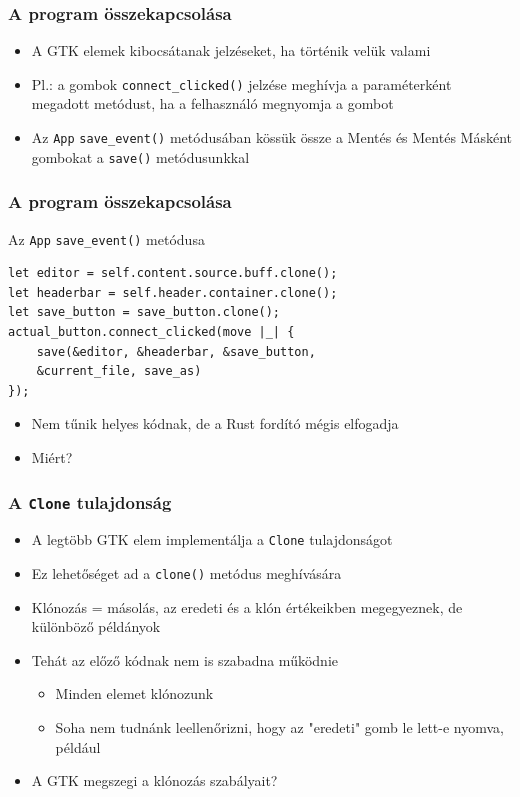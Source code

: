 \documentclass{beamer}
\begin{document}
    \begin{frame}[fragile]
        \frametitle{A program összekapcsolása}

        \begin{itemize}
            \item A GTK elemek kibocsátanak jelzéseket, ha történik velük valami
            \item Pl.: a gombok \texttt{connect\_clicked()} jelzése meghívja a paraméterként megadott metódust, ha a felhasználó megnyomja a gombot
            \item Az \texttt{App} \texttt{save\_event()} metódusában kössük össze a Mentés és Mentés Másként gombokat a \texttt{save()} metódusunkkal
        \end{itemize}
    \end{frame}

    \begin{frame}[fragile]
        \frametitle{A program összekapcsolása}

        \begin{block}{Az \texttt{App} \texttt{save\_event()} metódusa}
            \begin{lstlisting}
let editor = self.content.source.buff.clone();
let headerbar = self.header.container.clone();
let save_button = save_button.clone();
actual_button.connect_clicked(move |_| {
    save(&editor, &headerbar, &save_button, 
    &current_file, save_as)
});
            \end{lstlisting}
        \end{block}

        \begin{itemize}
            \item Nem tűnik helyes kódnak, de a Rust fordító mégis elfogadja
            \item Miért?
        \end{itemize}
    \end{frame}

    \begin{frame}[fragile]
        \frametitle{A \texttt{Clone} tulajdonság}

        \begin{itemize}
            \item A legtöbb GTK elem implementálja a \texttt{Clone} tulajdonságot
            \item Ez lehetőséget ad a \texttt{clone()} metódus meghívására
            \item Klónozás = másolás, az eredeti és a klón értékeikben megegyeznek, de különböző példányok
            \item Tehát az előző kódnak nem is szabadna működnie \begin{itemize}
                \item Minden elemet klónozunk
                \item Soha nem tudnánk leellenőrizni, hogy az "eredeti" gomb le lett-e nyomva, például
            \end{itemize}
            \item A GTK megszegi a klónozás szabályait?
        \end{itemize}
    \end{frame}
\end{document}
